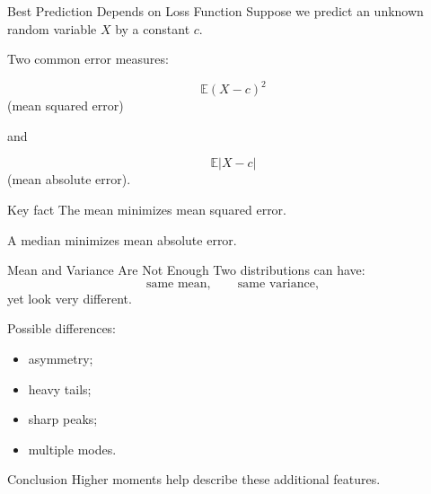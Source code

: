 \begin{frame}{Best Prediction Depends on Loss Function}
Suppose we predict an unknown random variable $X$ by a constant $c$.

\vspace{0.25cm}

Two common error measures:

\[
\mathbb{E}(X-c)^2
\]
(mean squared error)

\vspace{0.1cm}

and

\[
\mathbb{E}|X-c|
\]
(mean absolute error).

\vspace{0.25cm}

\begin{keybox}{Key fact}
The mean minimizes mean squared error.

A median minimizes mean absolute error.
\end{keybox}
\end{frame}

\begin{frame}{Mean and Variance Are Not Enough}
Two distributions can have:
\[
\text{same mean},
\qquad
\text{same variance},
\]
yet look very different.

\vspace{0.25cm}

Possible differences:
\begin{itemize}
    \item asymmetry;
    \item heavy tails;
    \item sharp peaks;
    \item multiple modes.
\end{itemize}

\vspace{0.25cm}

\begin{keybox}{Conclusion}
Higher moments help describe these additional features. 
\end{keybox}
\end{frame}


